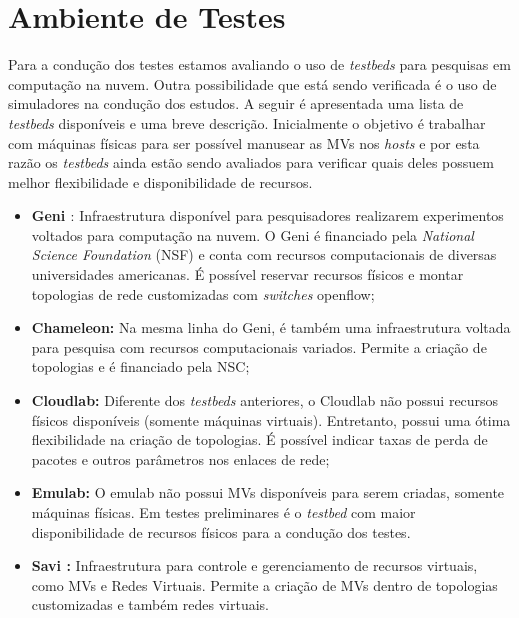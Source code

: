 \documentclass[10pt, conference, compsocconf]{IEEEtran}
\begin{document}
\section{Ambiente de Testes}
Para a condução dos testes estamos avaliando o uso de \textit{testbeds} para pesquisas em computação na nuvem. Outra possibilidade que está sendo verificada é o uso de simuladores na condução dos estudos. A seguir é apresentada uma lista de \textit{testbeds} disponíveis e uma breve descrição. Inicialmente o objetivo é trabalhar com máquinas físicas para ser possível manusear as MVs nos \textit{hosts} e por esta razão os \textit{testbeds} ainda estão sendo avaliados para verificar quais deles possuem melhor flexibilidade e disponibilidade de recursos.

\begin{itemize}
 \item \textbf{Geni \cite{Elliott:2009}}: Infraestrutura disponível para pesquisadores realizarem experimentos voltados para computação na nuvem. O Geni é financiado pela \textit{National Science Foundation} (NSF) e conta com recursos computacionais de diversas universidades americanas. É possível reservar recursos físicos e montar topologias de rede customizadas com \textit{switches} openflow;
 \item \textbf{Chameleon:} Na mesma linha do Geni, é também uma infraestrutura voltada para pesquisa com recursos computacionais variados. Permite a criação de topologias e é financiado pela NSC;
 \item \textbf{Cloudlab:} Diferente dos \textit{testbeds} anteriores, o Cloudlab não possui recursos físicos disponíveis (somente máquinas virtuais). Entretanto, possui uma ótima flexibilidade na criação de topologias. É possível indicar taxas de perda de pacotes e outros parâmetros nos enlaces de rede;
 \item \textbf{Emulab:} O emulab não possui MVs disponíveis para serem criadas, somente máquinas físicas. Em testes preliminares é o \textit{testbed} com maior disponibilidade de recursos físicos para a condução dos testes.
  \item \textbf{Savi \cite{Joon:2013} :} Infraestrutura para controle e gerenciamento de recursos virtuais, como MVs e Redes Virtuais. Permite a criação de MVs dentro de topologias customizadas e também redes virtuais.
\end{itemize}
\end{document}

